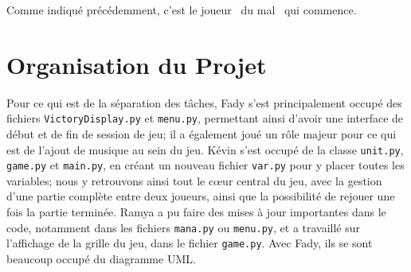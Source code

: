 \documentclass[11pt, a4paper, oneside, portrait]{article}
\begin{document}
            Comme indiqué précédemment, c'est le joueur \guillemotleft{}~du mal~\guillemotright{} qui commence.

    \section*{Organisation du Projet}
        Pour ce qui est de la séparation des tâches, Fady s'est principalement occupé des fichiers \texttt{VictoryDisplay.py} et \texttt{menu.py}, permettant ainsi d'avoir une interface de début et de fin de session de jeu; il a également joué un rôle majeur pour ce qui est de l'ajout de musique au sein du jeu.
        Kévin s'est occupé de la classe \texttt{unit.py}, \texttt{game.py} et \texttt{main.py}, en créant un nouveau fichier \texttt{var.py} pour y placer toutes les variables; nous y retrouvons ainsi tout le c\oe{}ur central du jeu, avec la gestion d'une partie complète entre deux joueurs, ainsi que la possibilité de rejouer une fois la partie terminée.
        Ramya a pu faire des mises à jour importantes dans le code, notamment dans les fichiers \texttt{mana.py} ou \texttt{menu.py}, et a travaillé sur l'affichage de la grille du jeu, dans le fichier \texttt{game.py}.
        Avec Fady, ils se sont beaucoup occupé du diagramme UML.


\end{document}
